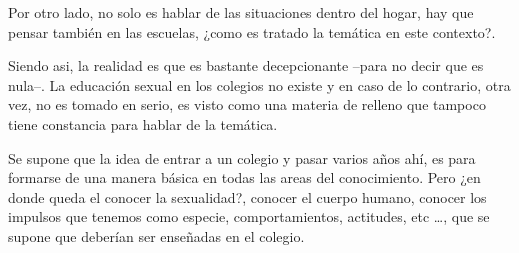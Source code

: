 \documentclass[letterpaper, 12pt]{article}
\begin{document}

Por otro lado, no solo es hablar de las situaciones dentro
del hogar, hay que pensar también en las escuelas, ¿como es
tratado la temática en este contexto?.

Siendo asi, la realidad es que es bastante decepcionante
--para no decir que es nula--. La educación sexual en los
colegios no existe y en caso de lo contrario, otra vez, no
es tomado en serio, es visto como una materia de relleno
que tampoco tiene constancia para hablar de la temática.

Se supone que la idea de entrar a un colegio y pasar varios
años ahí, es para formarse de una manera básica en todas
las areas del conocimiento. Pero ¿en donde queda el conocer
la sexualidad?, conocer el cuerpo humano, conocer los
impulsos que tenemos como especie, comportamientos,
actitudes, etc \dots\@, que se supone que deberían ser
enseñadas en el colegio.

\newpage

\printbibliography
\end{document}
